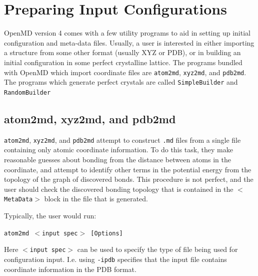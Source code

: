 \documentclass[]{book}
\begin{document}
\chapter{\label{section:PreparingInput} Preparing Input Configurations}

{\sc OpenMD} version 4 comes with a few utility programs to aid in
setting up initial configuration and meta-data files.  Usually, a user
is interested in either importing a structure from some other format
(usually XYZ or PDB), or in building an initial configuration in some
perfect crystalline lattice.  The programs bundled with {\sc OpenMD}
which import coordinate files are {\tt atom2md}, {\tt xyz2md}, and
{\tt pdb2md}. The programs which generate perfect crystals are called
{\tt SimpleBuilder} and {\tt RandomBuilder}

\section{\label{section:atom2md}atom2md, xyz2md, and pdb2md}

{\tt atom2md}, {\tt xyz2md}, and {\tt pdb2md} attempt to construct
{\tt .md} files from a single file containing only atomic coordinate
information.  To do this task, they make reasonable guesses about
bonding from the distance between atoms in the coordinate, and attempt
to identify other terms in the potential energy from the topology of
the graph of discovered bonds.  This procedure is not perfect, and the
user should check the discovered bonding topology that is contained in
the {\tt $<$MetaData$>$} block in the file that is generated.

Typically, the user would run:

{\tt atom2md $<$input spec$>$ [Options]}

Here {\tt $<$input spec$>$} can be used to specify the type of file being
used for configuration input. I.e. using {\tt -ipdb} specifies that the
input file contains coordinate information in the PDB format.
\end{document}
